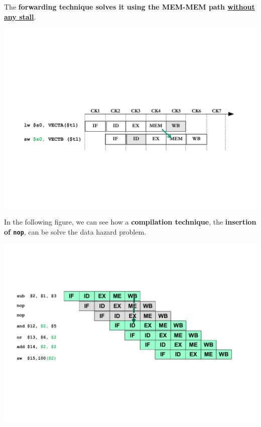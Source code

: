 \documentclass[a4paper]{article}
\begin{document}
\begin{itemize}
\begin{examplebox}
            The \textbf{forwarding technique solves it using the MEM-MEM path \underline{without any stall}}.
            \begin{center}
                \includegraphics[width=\textwidth]{img/load-store-hazard-problem-2.pdf}
            \end{center}
        \end{examplebox}
    \end{itemize}

    \begin{examplebox}\label{example: insertion of nop}
        In the following figure, we can see how a \textbf{compilation technique}, the \textbf{insertion of \texttt{nop}}, can be solve the data hazard problem.
        \begin{center}
            \includegraphics[width=\textwidth]{img/insertion-of-nop-1.pdf}
        \end{center}
    \end{examplebox}
\end{document}
